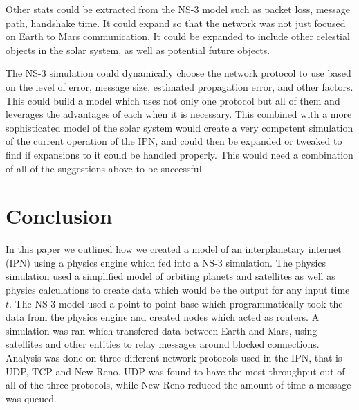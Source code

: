 \documentclass[a4paper,12pt]{article}
\begin{document}
Other stats could be extracted from the NS-3 model such as packet loss, message path, handshake time. It could expand 
so that the network was not just focused on Earth to Mars communication. It could be expanded to include other celestial 
objects in the solar system, as well as potential future objects. 

The NS-3 simulation could dynamically choose the network protocol to use based on the level of error, message size,
estimated propagation error, and other factors. This could build a model which uses not only one protocol but all of them 
and leverages the advantages of each when it is necessary. This combined with a more sophisticated model of the solar 
system would create a very competent simulation of the current operation of the IPN, and could then be expanded or tweaked 
to find if expansions to it could be handled properly. This would need a combination of all of the suggestions above 
to be successful.

\section{Conclusion}

In this paper we outlined how we created a model of an interplanetary internet (IPN) using a physics engine which fed into 
a NS-3 simulation. The physics simulation used a simplified model of orbiting planets and satellites as well as physics calculations 
to create data which would be the output for any input time $t$. The NS-3 model used a point to point base which programmatically
took the data from the physics engine and created nodes which acted as routers. A simulation was ran which transfered data between 
Earth and Mars, using satellites and other entities to relay messages around blocked connections. Analysis was done on three
different network protocols used in the IPN, that is UDP, TCP and New Reno. 
UDP was found to have the most throughput out of all of the three protocols, while New Reno reduced the amount of time a message 
was queued. 

\printbibliography
\end{document}
